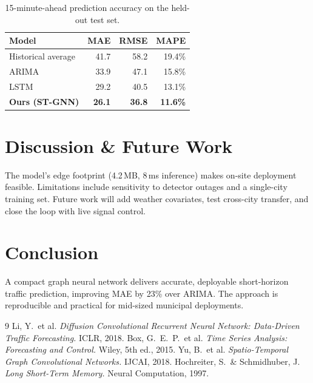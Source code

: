 \documentclass[11pt]{article}
\begin{document}
\begin{table}[ht]\centering
\caption{15-minute-ahead prediction accuracy on the held-out test set.}
\label{tab:res}
\begin{tabularx}{\linewidth}{@{}X r r r@{}}
\toprule
\textbf{Model} & \textbf{MAE} & \textbf{RMSE} & \textbf{MAPE}\\
\midrule
Historical average & 41.7 & 58.2 & 19.4\%\\
ARIMA              & 33.9 & 47.1 & 15.8\%\\
LSTM               & 29.2 & 40.5 & 13.1\%\\
\textbf{Ours (ST-GNN)} & \textbf{26.1} & \textbf{36.8} & \textbf{11.6\%}\\
\bottomrule
\end{tabularx}
\end{table}

\section{Discussion \& Future Work}
The model's edge footprint (4.2\,MB, 8\,ms inference) makes on-site deployment feasible.
Limitations include sensitivity to detector outages and a single-city training set. Future
work will add weather covariates, test cross-city transfer, and close the loop with live
signal control.

\section{Conclusion}
A compact graph neural network delivers accurate, deployable short-horizon traffic
prediction, improving MAE by 23\% over ARIMA. The approach is reproducible and practical
for mid-sized municipal deployments.

\begin{thebibliography}{9}
\setlength{\itemsep}{2pt}
 Li, Y.\ et al. \textit{Diffusion Convolutional Recurrent Neural Network:
  Data-Driven Traffic Forecasting.} ICLR, 2018.
 Box, G.\ E.\ P.\ et al. \textit{Time Series Analysis: Forecasting and
  Control.} Wiley, 5th ed., 2015.
 Yu, B.\ et al. \textit{Spatio-Temporal Graph Convolutional Networks.}
  IJCAI, 2018.
 Hochreiter, S.\ \& Schmidhuber, J. \textit{Long Short-Term
  Memory.} Neural Computation, 1997.
\end{thebibliography}
\end{document}
